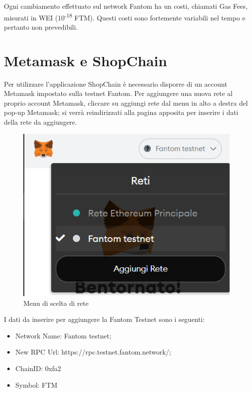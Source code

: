 
Ogni cambiamento effettuato sul network Fantom ha un costi, chiamati Gas Fees\glo{}, misurati in WEI\glo{} (10\textsuperscript{-18} FTM).
Questi costi sono fortemente variabili nel tempo e pertanto non prevedibili.

\section{Metamask e ShopChain}

Per utilizzare l'applicazione ShopChain è necessario disporre di un account Metamask impostato sulla testnet Fantom.
Per aggiungere una nuova rete al proprio account Metamask, cliccare su aggiungi rete dal menu in alto a destra del pop-up Metamask;
 si verrà reindirizzati alla pagina apposita per inserire i dati della rete da aggiungere.

 \begin{figure}[htbp]
    \centering
    \includegraphics{immagini/settmeta1.png}
    \caption{Menu di scelta di rete}
\end{figure} 

I dati da inserire per aggiungere la Fantom Testnet sono i seguenti:

\begin{itemize}
    \item Network Name: Fantom testnet;
    \item New RPC Url: https://rpc.testnet.fantom.network/;
    \item ChainID: 0xfa2
    \item Symbol: FTM
\end{itemize}

